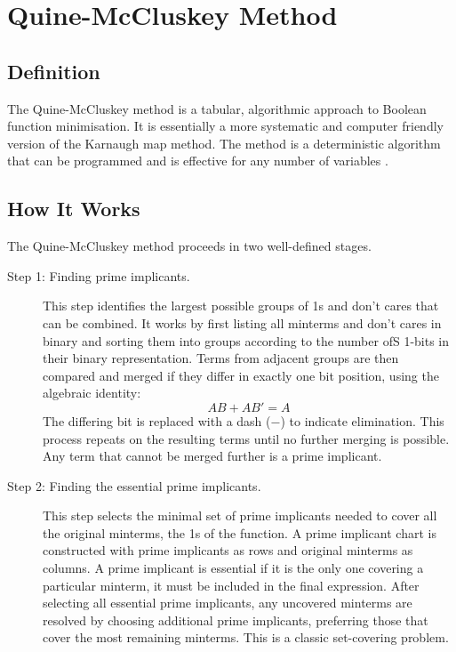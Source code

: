 \section{Quine-McCluskey Method}

\subsection{Definition}
The Quine-McCluskey method is a tabular, algorithmic approach to Boolean
function minimisation. It is essentially a more systematic and
computer friendly version of the Karnaugh map method. The method is a
deterministic algorithm that can be programmed and is effective for any
number of variables \cite{rosen2013}.

\subsection{How It Works}

The Quine-McCluskey method proceeds in two well-defined stages.

\begin{description}
    \item[Step 1: Finding prime implicants.]
    This step identifies the largest possible groups of 1s and don't cares
    that can be combined. It works by first listing all minterms and don't
    cares in binary and sorting them into groups according to the number ofS
    1-bits in their binary representation. Terms from adjacent groups are
    then compared and merged if they differ in exactly one bit
    position, using the algebraic identity:
    \[
        AB + AB' = A
    \]
    The differing bit is replaced with a dash ($-$) to indicate elimination.
    This process repeats on the resulting terms until no further merging is
    possible. Any term that cannot be merged further is a prime implicant.

    \item[Step 2: Finding the essential prime implicants.]
    This step selects the minimal set of prime implicants needed to cover
    all the original minterms, the 1s of the function. A
    prime implicant chart is constructed with prime implicants as
    rows and original minterms as columns. A prime implicant is
    essential if it is the only one covering a particular minterm, it must be included in the final expression. After selecting all
    essential prime implicants, any uncovered minterms are resolved by
    choosing additional prime implicants, preferring those that cover the
    most remaining minterms. This is a classic set-covering problem.
\end{description}

